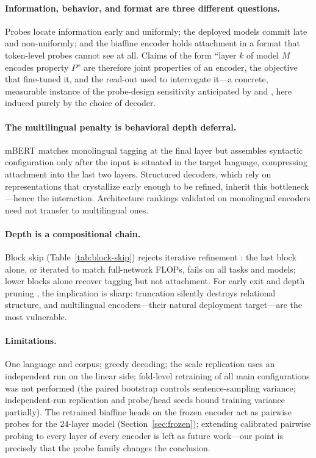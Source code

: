\documentclass[letterpaper]{article}
\begin{document}
\paragraph{Information, behavior, and format are three different questions.}
Probes locate information early and uniformly; the deployed models commit
late and non-uniformly; and the biaffine encoder holds attachment in a format
that token-level probes cannot see at all. Claims of the form ``layer $k$ of
model $M$ encodes property $P$'' are therefore joint properties of an encoder,
the objective that fine-tuned it, and the read-out used to interrogate it---a
concrete, measurable instance of the probe-design sensitivity anticipated by
\citet{hewitt2019control} and \citet{belinkov2022probing}, here induced purely
by the choice of decoder.

\paragraph{The multilingual penalty is behavioral depth deferral.}
mBERT matches monolingual tagging at the final layer but assembles syntactic
configuration only after the input is situated in the target language,
compressing attachment into the last two layers. Structured decoders, which
rely on representations that crystallize early enough to be refined, inherit
this bottleneck---hence the interaction. Architecture rankings validated on
monolingual encoders need not transfer to multilingual ones.

\paragraph{Depth is a compositional chain.}
Block skip (Table~\ref{tab:block-skip}) rejects iterative refinement
\cite{jastrzebski2018residual}: the last block alone, or iterated to match
full-network FLOPs, fails on all tasks and models; lower blocks alone recover
tagging but not attachment. For early exit and depth pruning
\cite{xin2020deebert,fan2020layerdrop}, the implication is sharp: truncation
silently destroys relational structure, and multilingual encoders---their
natural deployment target---are the most vulnerable.

\paragraph{Limitations.}
One language and corpus; greedy decoding; the scale replication uses an
independent run on the linear side; fold-level retraining of all main
configurations was not performed (the paired bootstrap controls
sentence-sampling variance; independent-run replication and probe/head seeds
bound training variance partially). The retrained biaffine heads on the
frozen encoder act as pairwise probes for the 24-layer model
(Section~\ref{sec:frozen}); extending calibrated pairwise probing to every
layer of every encoder is left as future work---our point is precisely that
the probe family changes the conclusion.
\end{document}

